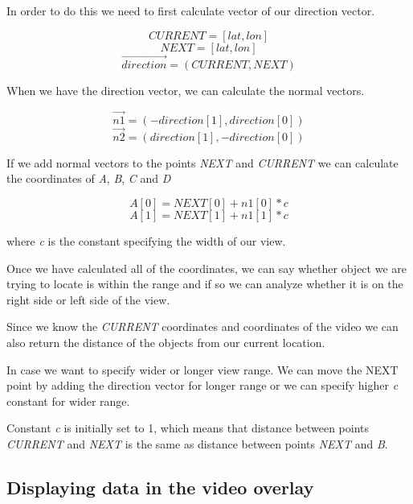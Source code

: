 \documentclass[journal]{IEEEtran}
\begin{document}
In order to do this we need to first calculate vector of our direction vector.

\begin{displaymath}
CURRENT = [lat, lon]
\end{displaymath}
\begin{displaymath}
NEXT = [lat, lon]
\end{displaymath}
\begin{displaymath}
\vec{direction} = (CURRENT, NEXT)
\end{displaymath}

When we have the direction vector, we can calculate the normal vectors.

\begin{displaymath}
\vec{n1} = (-direction[1], direction[0])
\end{displaymath}
\begin{displaymath}
\vec{n2} = (direction[1], -direction[0])
\end{displaymath}

If we add normal vectors to the points \textit{NEXT} and \textit{CURRENT} we can calculate the coordinates of \textit{A}, \textit{B}, \textit{C} and \textit{D}

\begin{displaymath}
A[0] = NEXT[0] + n1[0]*c
\end{displaymath}
\begin{displaymath}
A[1] = NEXT[1] + n1[1]*c
\end{displaymath}

where \textit{c} is the constant specifying the width of our view.

Once we have calculated all of the coordinates, we can say whether object we are trying to locate is within the range and if so we can analyze whether it is on the right side or left side of the view.

Since we know the \textit{CURRENT} coordinates and coordinates of the video we can also return the distance of the objects from our current location.

In case we want to specify wider or longer view range. We can move the NEXT point by adding the direction vector for longer range or we can specify higher \textit{c} constant for wider range.

Constant \textit{c} is initially set to 1, which means that distance between points \textit{CURRENT} and \textit{NEXT} is the same as distance between points \textit{NEXT} and \textit{B}.

\subsection{Displaying data in the video overlay}
\end{document}
